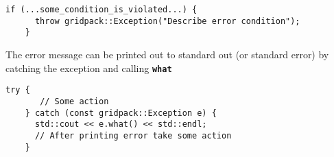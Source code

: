 {
\color{red}
\begin{Verbatim}[fontseries=b]
    if (...some_condition_is_violated...) {
      throw gridpack::Exception("Describe error condition");
    }
\end{Verbatim}
}

The error message can be printed out to standard out (or standard error) by catching the exception and calling \texttt{\textbf{what}}

{
\color{red}
\begin{Verbatim}[fontseries=b]
    try {
       // Some action
    } catch (const gridpack::Exception e) {
      std::cout << e.what() << std::endl;
      // After printing error take some action
    }
\end{Verbatim}
}
